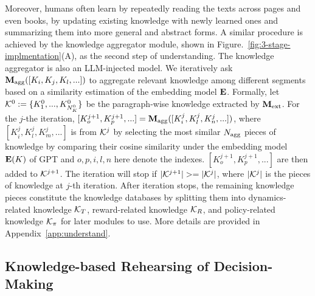 Moreover, humans often learn by repeatedly reading the texts across pages and even books, by updating existing knowledge with newly learned ones and summarizing them into more general and abstract forms. A similar procedure is achieved by the knowledge aggregator module, shown in Figure.~\ref{fig:3-stage-implmentation}(A), as the second step of understanding. The knowledge aggregator is also an LLM-injected model. We iteratively ask $\mathbf{M}_{\rm agg}([K_i, K_j, K_l, ...])$ to aggregate relevant knowledge among different segments based on a similarity estimation of the embedding model $\mathbf{E}$. Formally, let $\mathcal{K}^0:=\{K_1^0, ..., K^0_{N_K^0}\}$ be the paragraph-wise knowledge extracted by $\mathbf{M}_{\rm ext}$. For the $j$-the iteration, $[K^{j+1}_o, K^{j+1}_p, ...]=\mathbf{M}_{\rm agg}([K^{j}_i, K^{j}_l, K^{j}_n, ...])$, where $[K^{j}_i, K^{j}_l, K^{j}_m, ...]$ is from $\mathcal{K}^j$ by selecting the most similar $N_{\rm agg}$ pieces of knowledge by comparing their cosine similarity under the embedding model $\mathbf{E}(K)$ of GPT and $o,p,i,l,n$ here denote the indexes. $[K^{j+1}_o, K^{j+1}_p, ...]$ are then added to $\mathcal{K}^{j+1}$. 
The iteration will stop if $|\know^{j+1}|>=|\know^{j}|$, where $|\mathcal{K}^{j}|$ is the pieces of knowledge at $j$-th iteration. 
After iteration stops, the remaining knowledge pieces constitute the knowledge databases by splitting them into dynamics-related knowledge $\mathcal{K}_{T}$, reward-related knowledge $\mathcal{K}_{R}$, and policy-related knowledge $\mathcal{K}_{\pi}$ for later modules to use. More details are provided in Appendix~\ref{app:understand}. 




\vspace{-1mm}
\subsection{Knowledge-based Rehearsing of Decision-Making}
\label{sec:rehearsing}
\vspace{-2mm}

